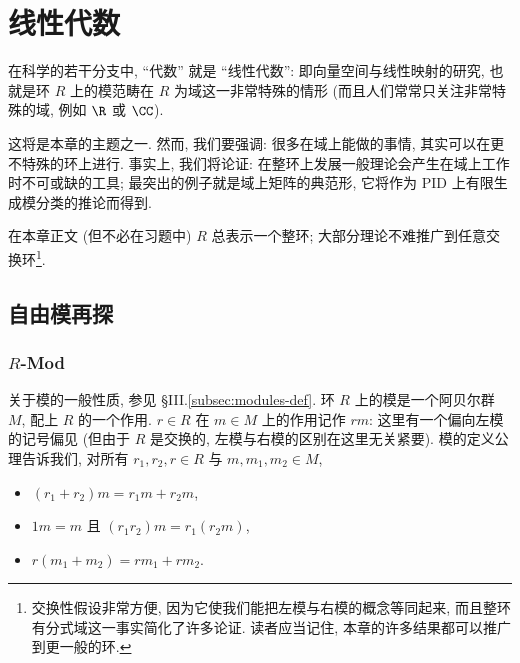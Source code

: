 
\chapter{线性代数}
\label{chap:linear-algebra}


在科学的若干分支中, ``代数'' 就是 ``线性代数'': 即向量空间与线性映射的研究, 也就是环 $R$ 上的模范畴在 $R$ 为域这一非常特殊的情形 (而且人们常常只关注非常特殊的域, 例如 $\R$ 或 $\CC$).

这将是本章的主题之一. 然而, 我们要强调: 很多在域上能做的事情, 其实可以在更不特殊的环上进行. 事实上, 我们将论证: 在整环上发展一般理论会产生在域上工作时不可或缺的工具; 最突出的例子就是域上矩阵的典范形, 它将作为 PID 上有限生成模分类的推论而得到.

在本章正文 (但不必在习题中) $R$ 总表示一个整环; 大部分理论不难推广到任意交换环\footnote{交换性假设非常方便, 因为它使我们能把左模与右模的概念等同起来, 而且整环有分式域这一事实简化了许多论证. 读者应当记住, 本章的许多结果都可以推广到更一般的环.}.

\section{自由模再探}
\label{sec:free-modules-revisited}

\subsection{\texorpdfstring{$R$}{R}-Mod}
\label{subsec:r-mod}

关于模的一般性质, 参见 §III.\ref{subsec:modules-def}. 环 $R$ 上的模是一个阿贝尔群 $M$, 配上 $R$ 的一个作用. $r\in R$ 在 $m\in M$ 上的作用记作 $rm$: 这里有一个偏向左模的记号偏见 (但由于 $R$ 是交换的, 左模与右模的区别在这里无关紧要). 模的定义公理告诉我们, 对所有 $r_1,r_2,r\in R$ 与 $m,m_1,m_2\in M$,
\begin{itemize}
\item $(r_1+r_2)m = r_1m + r_2m$,
\item $1m=m$ 且 $(r_1r_2)m = r_1(r_2m)$,
\item $r(m_1+m_2) = rm_1 + rm_2$.
\end{itemize}

